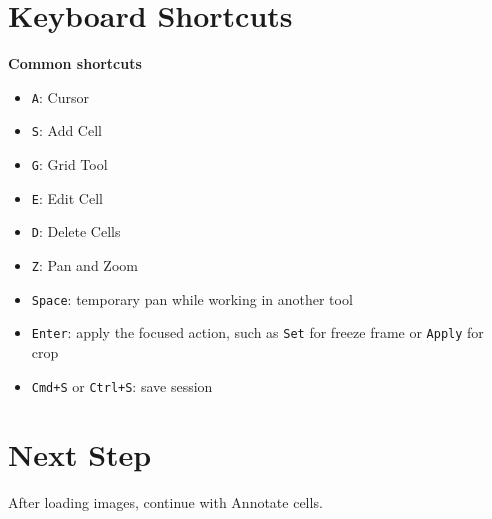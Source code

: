 \documentclass[
  9pt,
  letterpaper,
  oneside,
  open=any,
  DIV=15,
  parskip=half-,
  headings=big,
  numbers=noenddot
]{scrbook}
\newcommand{\manuallead}[1]{%
  \vspace{0.15em}%
  {\sffamily\bfseries\color{ManualBlue}#1}\par\nobreak\vspace{0.05em}%
}
\begin{document}
\section{Keyboard Shortcuts}

\manuallead{Common shortcuts}

\begin{itemize}[leftmargin=*,itemsep=0.35em,topsep=0.4em]
\item \texttt{A}: Cursor
\item \texttt{S}: Add Cell
\item \texttt{G}: Grid Tool
\item \texttt{E}: Edit Cell
\item \texttt{D}: Delete Cells
\item \texttt{Z}: Pan and Zoom
\item \texttt{Space}: temporary pan while working in another tool
\item \texttt{Enter}: apply the focused action, such as \texttt{Set} for freeze frame or \texttt{Apply} for crop
\item \texttt{Cmd+S} or \texttt{Ctrl+S}: save session
\end{itemize}

\section{Next Step}

After loading images, continue with Annotate cells.
\end{document}
